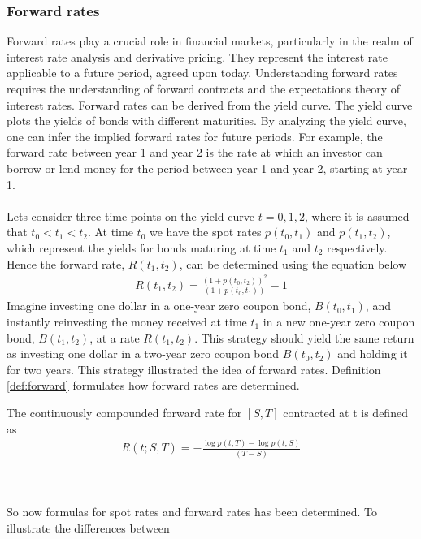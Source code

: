 \subsubsection{Forward rates}
Forward rates play a crucial role in financial markets, particularly in the realm of interest rate analysis and 
derivative pricing. They represent the interest rate applicable to a future period, agreed upon today.
Understanding forward rates requires the understanding of forward contracts and the expectations theory of interest rates.
Forward rates can be derived from the yield curve. The yield curve plots the yields of bonds with different maturities.
By analyzing the yield curve, one can infer the implied forward rates for future periods. For example, 
the forward rate between year 1 and year 2 is the rate at which an investor can borrow or lend money for the period
between year 1 and year 2, starting at year 1.
\\\\
Lets consider three time points on the yield curve $t=0,1,2$, where it is assumed
that $t_0 < t_1 < t_2$. At time $t_0$ we have the spot rates $p(t_0,t_1)$ and $p(t_1,t_2)$,
which represent the yields for bonds maturing at time $t_1$ and $t_2$ respectively.
Hence the forward rate, $R(t_1,t_2)$, can be determined using the equation below \cite{Bjork}
\begin{align*}
    R(t_1,t_2)= \frac{(1+p(t_0,t_2))^2}{(1+p(t_0,t_1))}-1
\end{align*}
Imagine investing one dollar in a one-year zero coupon bond, $B(t_0,t_1)$,
and instantly reinvesting the money received at time $t_1$ in a new one-year zero coupon bond,
$B(t_1,t_2)$, at a rate $R(t_1,t_2)$. This strategy should yield the same return as investing 
one dollar in a two-year zero coupon bond $B(t_0,t_2)$ and holding it for two years. 
This strategy illustrated the idea of forward rates. 
Definition \ref{def:forward} formulates how forward rates are determined. 
\begin{definition}\label{def:forward}
    The continuously compounded forward rate for $[S,T]$ contracted at t is defined
    as \cite{Bjork} 
    \begin{align*}
        R(t;S,T)= - \frac{\log p(t,T)- \log p(t,S)}{(T-S)} 
    \end{align*}
\end{definition} 
\noindent
\\\\
So now formulas for spot rates and forward rates has been determined. To illustrate the differences between 
